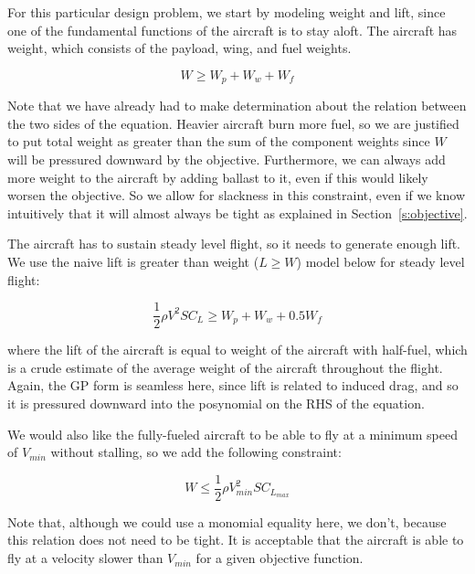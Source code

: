 For this particular design problem, we start by modeling
weight and lift, since one of the fundamental functions of the aircraft is to stay aloft.
The aircraft has weight, which consists of the payload, wing, and fuel weights. 

\begin{equation}
    W \geq W_p + W_w + W_f
\end{equation}

Note that we have already had to make determination about the relation between
the two sides of the equation. Heavier aircraft burn more fuel, so we are justified
to put total weight as greater than the sum of the component weights since
$W$ will be pressured downward by the objective. Furthermore, we can
always add more weight to the aircraft by adding ballast to it, even if this would likely
worsen the objective. So we allow for slackness in this constraint, even
if we know intuitively that it will almost always be tight as explained in Section~\ref{s:objective}.

The aircraft has to sustain steady level flight,
so it needs to generate enough lift. We use the naive
lift is greater than weight ($L \geq W$)
model below for steady level flight:

\begin{equation}
   \frac{1}{2} \rho V^2 S C_L  \geq  W_p + W_w + 0.5 W_f
\end{equation}

where the lift of the aircraft is equal to weight of the aircraft with half-fuel, 
which is a crude estimate of the average weight of the aircraft throughout the flight.
Again, the \gls{GP} form is seamless here, since lift is related to
induced drag, and so it is pressured downward into the posynomial on the \gls{RHS} of the equation.

We would also like the fully-fueled aircraft to be able to fly at a minimum speed 
of $V_{min}$ without stalling, so we add the following constraint:

\begin{equation}
    W \leq \frac{1}{2} \rho V_{min}^2 S C_{L_{max}}
\end{equation}

Note that, although we could use a monomial equality here, we don't, because this
relation does not need to be tight. It is acceptable that the aircraft is able to
fly at a velocity slower than $V_{min}$ for a given objective function.

